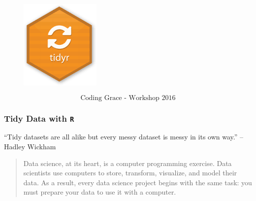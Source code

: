 \documentclass[TIDYMASTER.tex]{subfiles}
\begin{document}
 


	\begin{frame}
	
		\begin{figure}
			\centering
		\includegraphics[width=0.65\linewidth]{images/TidyRLogo}
		\end{figure}
		\[\mbox{Coding Grace - Workshop 2016}\]
	\end{frame}
\begin{frame}
	\frametitle{Tidy Data with \texttt{R}}
	\large
	\begin{framed}
		“Tidy datasets are all alike but every messy dataset is messy in its own way.” – Hadley Wickham
	\end{framed}
	
	\begin{framed}
		\begin{quote}
			Data science, at its heart, is a computer programming exercise. Data scientists use computers to store, transform, visualize, and model their data. As a result, every data science project begins with the same task: you must prepare your data to use it with a computer.
		\end{quote} 
	\end{framed}
\end{frame}
\end{document}
